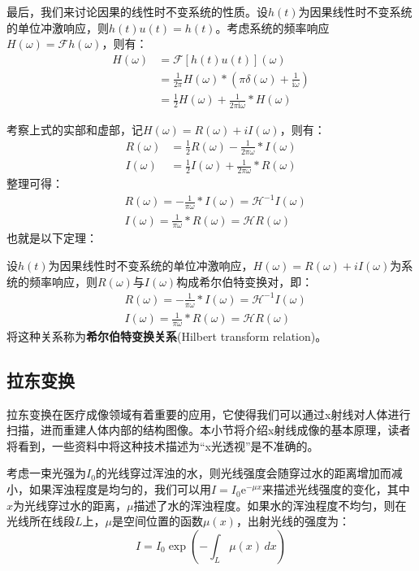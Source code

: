 \documentclass{ctexbook}
\begin{document}
最后，我们来讨论因果的线性时不变系统的性质。设$h(t)$为因果线性时不变系统的单位冲激响应，则$h(t)u(t)=h(t)$。考虑系统的频率响应$H(\omega)=\mathcal{F} h(\omega)$，则有：
\begin{align*}
    H(\omega)&=\mathcal{F} [h(t)u(t)](\omega)\\
    &=\frac{1}{2\pi}H(\omega)*\left(\pi\delta(\omega)+\frac{1}{\mathrm{i}\omega}\right)\\
    &=\frac{1}{2}H(\omega)+\frac{1}{2\pi \mathrm{i}\omega}*H(\omega)
\end{align*}

考察上式的实部和虚部，记$H(\omega)=R(\omega)+iI(\omega)$，则有：
\begin{align*}
    R(\omega)&=\frac{1}{2}R(\omega)-\frac{1}{2\pi \omega}*I(\omega)\\
    I(\omega)&=\frac{1}{2}I(\omega)+\frac{1}{2\pi \omega}*R(\omega)
\end{align*}
整理可得：
\begin{align*}
    &R(\omega)=-\frac{1}{\pi \omega}*I(\omega)=\mathcal{H} ^{-1}I(\omega)\\
    &I(\omega)=\frac{1}{\pi \omega}*R(\omega)=\mathcal{H} R(\omega)
\end{align*}
也就是以下定理：
\begin{theorem}[希尔伯特变换关系]
    设$h(t)$为因果线性时不变系统的单位冲激响应，$H(\omega)=R(\omega)+iI(\omega)$为系统的频率响应，则$R(\omega)$与$I(\omega)$构成希尔伯特变换对，即：
    \begin{align*}
    &R(\omega)=-\frac{1}{\pi \omega}*I(\omega)=\mathcal{H} ^{-1}I(\omega)\\
    &I(\omega)=\frac{1}{\pi \omega}*R(\omega)=\mathcal{H} R(\omega)
\end{align*}
将这种关系称为\textbf{希尔伯特变换关系}(Hilbert transform relation)。
\end{theorem}

\subsection{拉东变换}\label{sub:radon}

拉东变换在医疗成像领域有着重要的应用，它使得我们可以通过x射线对人体进行扫描，进而重建人体内部的结构图像。本小节将介绍x射线成像的基本原理，读者将看到，一些资料中将这种技术描述为“x光透视”是不准确的。

考虑一束光强为$I_0$的光线穿过浑浊的水，则光线强度会随穿过水的距离增加而减小，如果浑浊程度是均匀的，我们可以用$I=I_0 \mathrm{e}^{-\mu x}$来描述光线强度的变化，其中$x$为光线穿过水的距离，$\mu$描述了水的浑浊程度。如果水的浑浊程度不均匀，则在光线所在线段$L$上，$\mu$是空间位置的函数$\mu(x)$，出射光线的强度为：
\[I=I_0 \exp\left(-\int_{L}\mu(x)\,dx\right)\]
\end{document}
